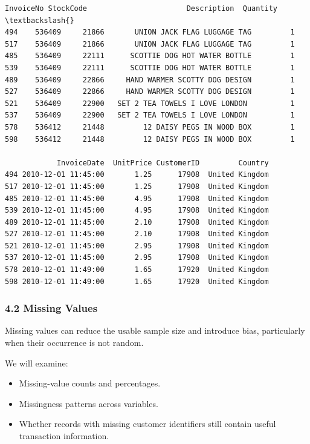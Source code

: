 \documentclass[11pt]{article}
\providecommand{\tightlist}{%
      \setlength{\itemsep}{0pt}\setlength{\parskip}{0pt}}
\begin{document}
    
    \begin{Verbatim}[commandchars=\\\{\}]
    InvoiceNo StockCode                       Description  Quantity  \textbackslash{}
494    536409     21866       UNION JACK FLAG LUGGAGE TAG         1   
517    536409     21866       UNION JACK FLAG LUGGAGE TAG         1   
485    536409     22111      SCOTTIE DOG HOT WATER BOTTLE         1   
539    536409     22111      SCOTTIE DOG HOT WATER BOTTLE         1   
489    536409     22866     HAND WARMER SCOTTY DOG DESIGN         1   
527    536409     22866     HAND WARMER SCOTTY DOG DESIGN         1   
521    536409     22900   SET 2 TEA TOWELS I LOVE LONDON          1   
537    536409     22900   SET 2 TEA TOWELS I LOVE LONDON          1   
578    536412     21448         12 DAISY PEGS IN WOOD BOX         1   
598    536412     21448         12 DAISY PEGS IN WOOD BOX         1   

            InvoiceDate  UnitPrice CustomerID         Country  
494 2010-12-01 11:45:00       1.25      17908  United Kingdom  
517 2010-12-01 11:45:00       1.25      17908  United Kingdom  
485 2010-12-01 11:45:00       4.95      17908  United Kingdom  
539 2010-12-01 11:45:00       4.95      17908  United Kingdom  
489 2010-12-01 11:45:00       2.10      17908  United Kingdom  
527 2010-12-01 11:45:00       2.10      17908  United Kingdom  
521 2010-12-01 11:45:00       2.95      17908  United Kingdom  
537 2010-12-01 11:45:00       2.95      17908  United Kingdom  
578 2010-12-01 11:49:00       1.65      17920  United Kingdom  
598 2010-12-01 11:49:00       1.65      17920  United Kingdom  
    \end{Verbatim}

    
    \subsubsection{4.2 Missing Values}\label{missing-values}

Missing values can reduce the usable sample size and introduce bias,
particularly when their occurrence is not random.

We will examine:

\begin{itemize}
\tightlist
\item
  Missing-value counts and percentages.
\item
  Missingness patterns across variables.
\item
  Whether records with missing customer identifiers still contain useful
  transaction information.
\end{itemize}
\end{document}
